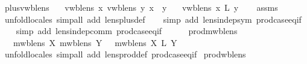 \begin{isabellebody}
\isamarkupfalse%
%
\endisatagproof
{\isafoldproof}%
%
\isadelimproof
\isanewline
%
\endisadelimproof
\isanewline
{}\isamarkupfalse%
\ plus{\isacharunderscore}vwb{\isacharunderscore}lens{\isacharcolon}\isanewline
\ \ \ {\isachardoublequoteopen}vwb{\isacharunderscore}lens\ x{\isachardoublequoteclose}\ {\isachardoublequoteopen}vwb{\isacharunderscore}lens\ y{\isachardoublequoteclose}\ {\isachardoublequoteopen}x\ {\isasymbowtie}\ y{\isachardoublequoteclose}\isanewline
\ \ \ {\isachardoublequoteopen}vwb{\isacharunderscore}lens\ {\isacharparenleft}x\ {\isacharplus}\isactrlsub L\ y{\isacharparenright}{\isachardoublequoteclose}\isanewline
%
\isadelimproof
\ \ %
\endisadelimproof
%
\isatagproof
{}\isamarkupfalse%
\ assms\isanewline
\ \ \isamarkupfalse%
\ {\isacharparenleft}unfold{\isacharunderscore}locales{\isacharcomma}\ simp{\isacharunderscore}all\ add{\isacharcolon}\ lens{\isacharunderscore}plus{\isacharunderscore}def{\isacharparenright}\isanewline
\ \ \isamarkupfalse%
\ {\isacharparenleft}simp\ add{\isacharcolon}\ lens{\isacharunderscore}indep{\isacharunderscore}sym\ prod{\isachardot}case{\isacharunderscore}eq{\isacharunderscore}if{\isacharparenright}\isanewline
\ \ \isamarkupfalse%
\ {\isacharparenleft}simp\ add{\isacharcolon}\ lens{\isacharunderscore}indep{\isacharunderscore}comm\ prod{\isachardot}case{\isacharunderscore}eq{\isacharunderscore}if{\isacharparenright}\isanewline
{}\isamarkupfalse%
%
\endisatagproof
{\isafoldproof}%
%
\isadelimproof
\isanewline
%
\endisadelimproof
\ \ \ \ \isanewline
{}\isamarkupfalse%
\ prod{\isacharunderscore}mwb{\isacharunderscore}lens{\isacharcolon}\isanewline
\ \ {\isachardoublequoteopen}{\isasymlbrakk}\ mwb{\isacharunderscore}lens\ X{\isacharsemicolon}\ mwb{\isacharunderscore}lens\ Y\ {\isasymrbrakk}\ {\isasymLongrightarrow}\ mwb{\isacharunderscore}lens\ {\isacharparenleft}X\ {\isasymtimes}\isactrlsub L\ Y{\isacharparenright}{\isachardoublequoteclose}\isanewline
%
\isadelimproof
\ \ %
\endisadelimproof
%
\isatagproof
{}\isamarkupfalse%
\ {\isacharparenleft}unfold{\isacharunderscore}locales{\isacharcomma}\ simp{\isacharunderscore}all\ add{\isacharcolon}\ lens{\isacharunderscore}prod{\isacharunderscore}def\ prod{\isachardot}case{\isacharunderscore}eq{\isacharunderscore}if{\isacharparenright}%
\endisatagproof
{\isafoldproof}%
%
\isadelimproof
\isanewline
%
\endisadelimproof
\isanewline
{}\isamarkupfalse%
\ prod{\isacharunderscore}wb{\isacharunderscore}lens{\isacharcolon}\isanewline

\end{isabellebody}
